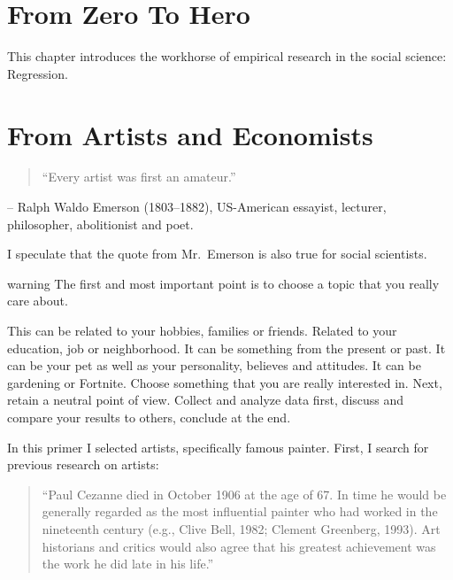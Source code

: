 \documentclass[
]{book}
\begin{document}
\hypertarget{from-zero-to-hero}{%
\section{From Zero To Hero}\label{from-zero-to-hero}}

This chapter introduces the workhorse of empirical research in the social science: Regression.

\hypertarget{from-artists-and-economists}{%
\section{From Artists and Economists}\label{from-artists-and-economists}}

\begin{quote}
``Every artist was first an amateur.''
\end{quote}

\hfill -- Ralph Waldo Emerson (1803--1882), US-American essayist, lecturer, philosopher, abolitionist and poet.

I speculate that the quote from Mr.~Emerson is also true for social scientists.

\begin{infobox}warning
The first and most important point is to choose a topic that you really care about.

\end{infobox}

This can be related to your hobbies, families or friends. Related to your education, job or neighborhood. It can be something from the present or past. It can be your pet as well as your personality, believes and attitudes. It can be gardening or Fortnite. Choose something that you are really interested in. Next, retain a neutral point of view. Collect and analyze data first, discuss and compare your results to others, conclude at the end.

In this primer I selected artists, specifically famous painter. First, I search for previous research on artists:

\begin{quote}
``Paul Cezanne died in October 1906 at the age of 67. In time he would be generally regarded as the most influential painter who had worked in the nineteenth century (e.g., Clive Bell, 1982; Clement Greenberg, 1993). Art historians and critics would also agree that his greatest achievement was the work he did late in his life.''
\end{quote}
\end{document}
